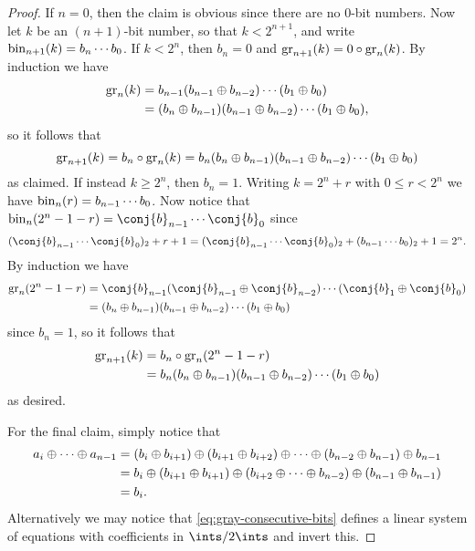 \documentclass[article, a4paper, 11pt, oneside]{memoir}
\numberwithin{equation}{chapter}
\begin{document}
\begin{proof}
    If $n = 0$, then the claim is obvious since there are no $0$-bit numbers. Now let $k$ be an $(n+1)$-bit number, so that $k < 2^{n+1}$, and write $\bin[n+1]{k} = b_n \cdots b_0$. If $k < 2^n$, then $b_n = 0$ and $\gray[n+1]{k} = 0 \conc \gray[n]{k}$. By induction we have
    \begin{align*}
        \gray[n]{k}
            &= b_{n-1} (b_{n-1} \xor b_{n-2}) \cdots (b_1 \xor b_0) \\
            &= (b_n \xor b_{n-1}) (b_{n-1} \xor b_{n-2}) \cdots (b_1 \xor b_0),
    \end{align*}
    so it follows that
    \begin{equation*}
        \gray[n+1]{k}
            = b_n \conc \gray[n]{k}
            = b_n (b_n \xor b_{n-1}) (b_{n-1} \xor b_{n-2}) \cdots (b_1 \xor b_0)
    \end{equation*}
    as claimed. If instead $k \geq 2^n$, then $b_n = 1$. Writing $k = 2^n + r$ with $0 \leq r < 2^n$ we have $\bin[n]{r} = b_{n-1} \cdots b_0$. Now notice that $\bin[n]{2^n - 1 - r} = \conj{b}_{n-1} \cdots \conj{b}_0$ since
    \begin{equation*}
        (\conj{b}_{n-1} \cdots \conj{b}_0)_2 + r + 1
            = (\conj{b}_{n-1} \cdots \conj{b}_0)_2 + (b_{n-1} \cdots b_0)_2 + 1
            = 2^n.
    \end{equation*}
    By induction we have
    \begin{align*}
        \gray[n]{2^n-1-r}
            &= \conj{b}_{n-1} (\conj{b}_{n-1} \xor \conj{b}_{n-2}) \cdots (\conj{b}_1 \xor \conj{b}_0) \\
            &= (b_n \xor b_{n-1}) (b_{n-1} \xor b_{n-2}) \cdots (b_1 \xor b_0)
    \end{align*}
    since $b_n = 1$, so it follows that
    \begin{align*}
        \gray[n+1]{k}
            &= b_n \conc \gray[n]{2^n - 1 - r} \\
            &= b_n (b_n \xor b_{n-1}) (b_{n-1} \xor b_{n-2}) \cdots (b_1 \xor b_0) 
    \end{align*}
    as desired.

    For the final claim, simply notice that
    \begin{align*}
        a_i \xor \cdots \xor a_{n-1}
            &= (b_i \xor b_{i+1}) \xor (b_{i+1} \xor b_{i+2}) \xor \cdots \xor (b_{n-2} \xor b_{n-1}) \xor b_{n-1} \\
            &= b_i \xor (b_{i+1} \xor b_{i+1}) \xor (b_{i+2} \xor \cdots \xor b_{n-2}) \xor (b_{n-1} \xor b_{n-1}) \\
            &= b_i.
    \end{align*}
    Alternatively we may notice that \cref{eq:gray-consecutive-bits} defines a linear system of equations with coefficients in $\ints/2\ints$ and invert this.
\end{proof}
\end{document}

